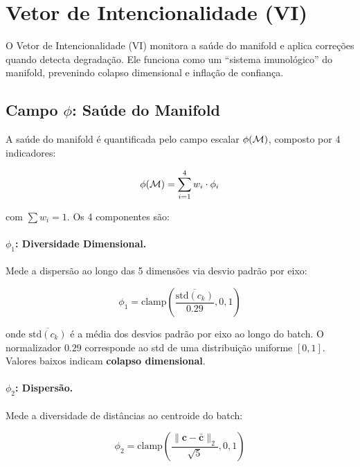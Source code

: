
\section{Vetor de Intencionalidade (VI)}
\label{sec:vi}

O Vetor de Intencionalidade (VI) monitora a sa\'ude do manifold e aplica
corre\c{c}\~oes quando detecta degrada\c{c}\~ao. Ele funciona como um
``sistema imunol\'ogico'' do manifold, prevenindo colapso dimensional
e infla\c{c}\~ao de confian\c{c}a.

\subsection{Campo $\phi$: Sa\'ude do Manifold}

A sa\'ude do manifold \'e quantificada pelo campo escalar $\phi(\mathcal{M})$,
composto por 4 indicadores:

\begin{equation}
    \phi(\mathcal{M}) = \sum_{i=1}^{4} w_i \cdot \phi_i
    \label{eq:phi_field}
\end{equation}

com $\sum w_i = 1$. Os 4 componentes s\~ao:

\paragraph{$\phi_1$: Diversidade Dimensional.}
Mede a dispers\~ao ao longo das 5 dimens\~oes via desvio padr\~ao por eixo:

\begin{equation}
    \phi_1 = \text{clamp}\left(\frac{\overline{\text{std}(c_k)}}{0.29}, 0, 1\right)
\end{equation}

onde $\overline{\text{std}(c_k)}$ \'e a m\'edia dos desvios padr\~ao por eixo
ao longo do batch. O normalizador $0.29$ corresponde ao std de uma
distribui\c{c}\~ao uniforme $[0,1]$. Valores baixos indicam
\textbf{colapso dimensional}.

\paragraph{$\phi_2$: Dispers\~ao.}
Mede a diversidade de dist\^ancias ao centroide do batch:

\begin{equation}
    \phi_2 = \text{clamp}\left(\frac{\|\bm{c} - \bar{\bm{c}}\|_2}{\sqrt{5}}, 0, 1\right)
\end{equation}

